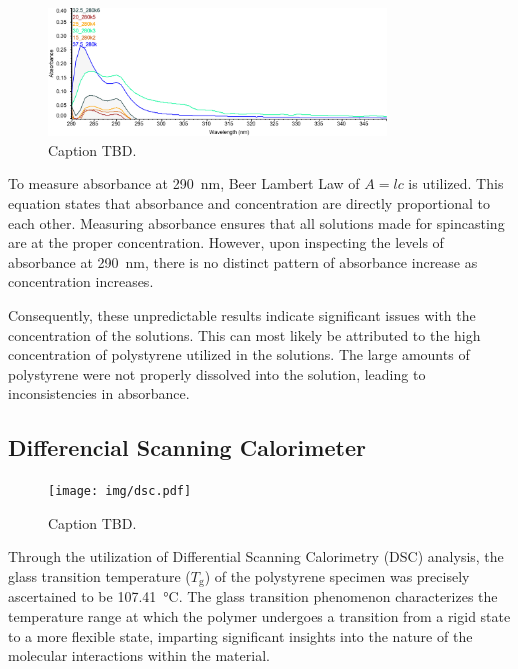 \documentclass[twocolumn]{article}
\begin{document}
                \begin{figure}
                    \centering
                    \includegraphics[width=0.8\textwidth]{img/uvvis.png}
                    \caption{Caption TBD.}\label{fig:uv-vis}
                \end{figure}
                To measure absorbance at \qty{290}{\nano\meter}, Beer Lambert Law of $A = lc$ is utilized. This equation states that absorbance and concentration are directly proportional to each other. Measuring absorbance ensures that all solutions made for spincasting are at the proper concentration. However, upon inspecting the levels of absorbance at \qty{290}{\nano\meter}, there is no distinct pattern of absorbance increase as concentration increases.
                
                Consequently, these unpredictable results indicate significant issues with the concentration of the solutions. This can most likely be attributed to the high concentration of polystyrene utilized in the solutions. The large amounts of  polystyrene were not properly dissolved into the solution, leading to inconsistencies in absorbance.                

            \subsection{Differencial Scanning Calorimeter}
                \begin{figure}
                    \centering
                    \texttt{[image: img/dsc.pdf]}
                    \caption{Caption TBD.}\label{fig:dsc}
                \end{figure}
                Through the utilization of Differential Scanning Calorimetry (DSC) analysis, the glass transition temperature ($T_\text{g}$) of the polystyrene specimen was precisely ascertained to be \qty{107.41}{\degreeCelsius}. The glass transition phenomenon characterizes the temperature range at which the polymer undergoes a transition from a rigid state to a more flexible state, imparting significant insights into the nature of the molecular interactions within the material. 
                
\end{document}
